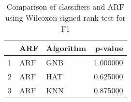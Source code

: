 \begin{table}
\footnotesize
\caption{Comparison of classifiers and ARF using Wilcoxon signed-rank test for F1}
\label{tab:ARF wilcoxon F1 comparison}
\begin{tabular}{lllr}
\hline
 & ARF & Algorithm & p-value \\
\hline
1 & ARF & GNB & 1.000000 \\
2 & ARF & HAT & 0.625000 \\
3 & ARF & KNN & 0.875000 \\
\hline
\end{tabular}
\end{table}
